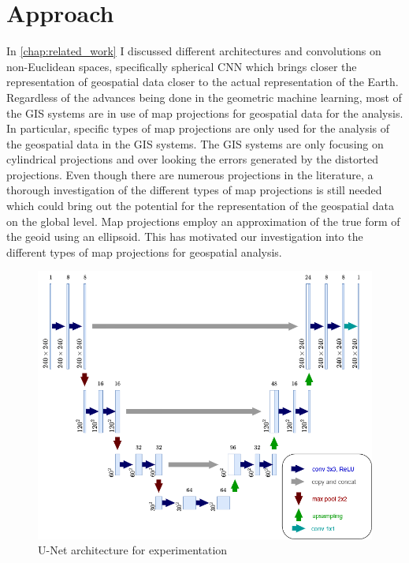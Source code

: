 \clearpage
\cleardoublepage

\chapter{Approach}
\label{chap:approach}
In  \autoref{chap:related_work} I discussed different architectures and convolutions on non-Euclidean spaces, specifically spherical CNN which brings closer the
representation of geospatial data closer to the actual representation of the Earth. Regardless of the advances being done in the geometric machine learning,
most of the GIS systems are in use of map projections for geospatial data for the analysis. In particular, specific types of map projections are only used for
the analysis of the geospatial data in the GIS systems. The GIS systems are only focusing on cylindrical projections and over looking the errors generated by
the distorted projections. Even though there are numerous projections in the literature, a thorough investigation of the different types of map projections is still
needed which could bring out the potential for the representation of the geospatial data on the global level. Map projections employ an approximation of the true form
of the geoid using an ellipsoid. This has motivated our investigation into the different types of map projections for geospatial analysis.

\begin{figure}[h]
    \centering
    \includegraphics[width=1.0\linewidth]{figures/chapter-5/my_unet.png}
    \caption{U-Net architecture for experimentation }
    \label{fig:self-unet}
\end{figure}

